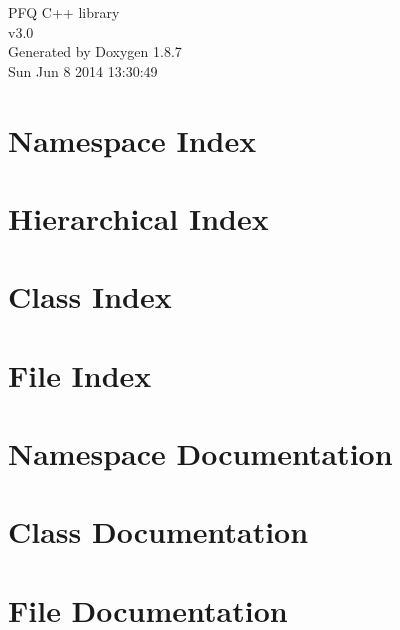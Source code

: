 \documentclass[twoside]{book}
\newcommand{\+}{\discretionary{\mbox{\scriptsize$\hookleftarrow$}}{}{}}
\newcommand{\clearemptydoublepage}{%
  \newpage{\pagestyle{empty}\cleardoublepage}%
}
\begin{document}
\hypersetup{pageanchor=false,
             bookmarks=true,
             bookmarksnumbered=true,
             pdfencoding=unicode
            }
\begin{titlepage}
\vspace*{7cm}
\begin{center}%
{\Large P\+F\+Q C++ library \\[1ex]\large v3.\+0 }\\
\vspace*{1cm}
{\large Generated by Doxygen 1.8.7}\\
\vspace*{0.5cm}
{\small Sun Jun 8 2014 13:30:49}\\
\end{center}
\end{titlepage}
\clearemptydoublepage
\tableofcontents
\clearemptydoublepage
{}
\hypersetup{pageanchor=true}

\chapter{Namespace Index}

\chapter{Hierarchical Index}

\chapter{Class Index}

\chapter{File Index}

\chapter{Namespace Documentation}



\chapter{Class Documentation}
















\chapter{File Documentation}





\newpage
{}
{}
\printindex
\end{document}
